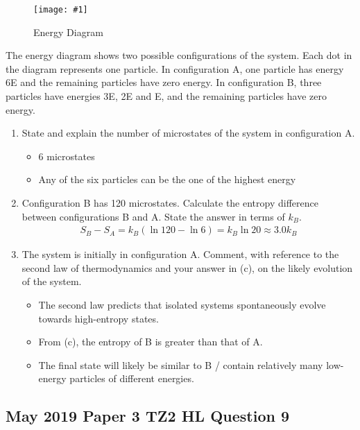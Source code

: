 \documentclass[a4paper,12pt]{article}
\newcommand{\img}[4]{\begin{center}
  \begin{figure}[H]
    \centering
    \texttt{[image: \#1]}
    \caption{#3}
    \label{fig:#4}
  \end{figure}
\end{center}}
\begin{document}
\img{ex/3.png}{0.5}{Energy Diagram}{ex3}

The energy diagram shows two possible configurations of the system. Each dot in the diagram represents one particle. In configuration A, one particle has energy 6E and the remaining particles have zero energy. In configuration B, three particles have energies 3E, 2E and E, and the remaining particles have zero energy.

\begin{enumerate}[label=(\alph*)]
  \item State and explain the number of microstates of the system in configuration A.
        \begin{itemize}
          \item 6 microstates
          \item Any of the six particles can be the one of the highest energy
        \end{itemize}
  \item Configuration B has 120 microstates. Calculate the entropy difference between configurations B and A. State the answer in terms of $k_B$.
        \begin{align*}
          S_B - S_A = k_B(\ln 120 - \ln 6) = k_B\ln 20 \approx 3.0 k_B
        \end{align*}
  \item The system is initially in configuration A. Comment, with reference to the second law of thermodynamics and your answer in (c), on the likely evolution of the system.
        \begin{itemize}
          \item The second law predicts that isolated systems spontaneously evolve towards high-entropy states.
          \item From (c), the entropy of B is greater than that of A.
          \item The final state will likely be similar to B / contain relatively many low-energy particles of different
                energies.
        \end{itemize}

\end{enumerate}

\pagebreak

\subsection{May 2019 Paper 3 TZ2 HL Question 9}
\end{document}
